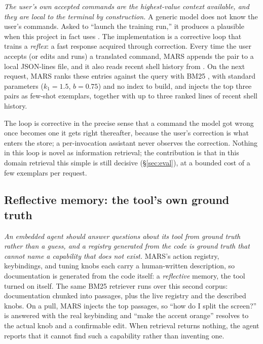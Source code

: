 \emph{The user's own accepted commands are the highest-value context available, and they
are local to the terminal by construction.} A generic model does not know the user's
commands. Asked to ``launch the training run,'' it produces a plausible
 when this project in fact uses
. The implementation is a corrective
loop that trains a \emph{reflex}: a fast response acquired through correction. Every time
the user accepts (or edits and runs) a translated command, MARS appends the
 pair to a local JSON-lines file, and it also reads recent shell
history from . On the next request, MARS ranks these entries against the
query with BM25 \citep{robertson2009bm25}, with standard parameters ($k_1{=}1.5$,
$b{=}0.75$) and no index to build, and injects the top three pairs as few-shot exemplars,
together with up to three ranked lines of recent shell history.

The loop is corrective in the precise sense that a command the model got wrong once
becomes one it gets right thereafter, because the user's correction is what enters the
store; a per-invocation assistant never observes the correction. Nothing in this loop is
novel as information retrieval; the contribution is that in this domain retrieval this
simple is still decisive (\S\ref{sec:eval}), at a bounded cost of a few exemplars per
request.

\subsection{Reflective memory: the tool's own ground truth}
\label{sec:m2}

\emph{An embedded agent should answer questions about its tool from ground truth
rather than a guess, and a registry generated from the code is ground truth that
cannot name a capability that does not exist.} MARS's action registry,
keybindings, and tuning knobs each carry a human-written description, so documentation
is generated from the code itself: a \emph{reflective} memory, the tool turned on
itself. The same BM25 retriever runs over this second corpus:
documentation chunked into passages, plus the live registry and the described knobs. On a  pull, MARS injects the top
passages, so ``how do I split the screen?'' is answered with the real keybinding and
``make the accent orange'' resolves to the actual knob and a confirmable edit. When
retrieval returns nothing, the agent reports that it cannot find such a capability
rather than inventing one.

